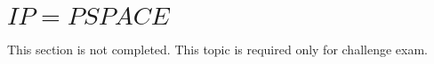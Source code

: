 \documentclass[a4paper,12pt]{article}
\theoremstyle{definition}
\newtheorem{theorem}[counter]{Theorem}
\newtheorem{corollary}[counter]{Corollary}
\theoremstyle{remark}
\begin{document}
\section{$IP = PSPACE$}
This section is not completed. This topic is required only for challenge exam.
%
%
%
%
%
%
%
%
%
%
%
%
%
%
\end{document}
